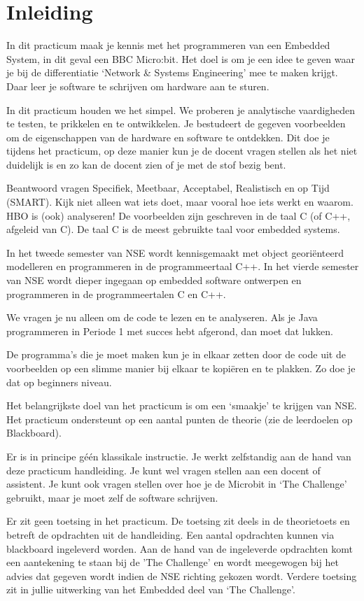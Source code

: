 \chapter{Inleiding}


In dit practicum maak je kennis met het programmeren van een Embedded System, in dit geval een 
BBC Micro:bit. Het doel is om je een idee te geven waar je bij de differentiatie ‘Network \& Systems Engineering’ mee te maken krijgt. Daar leer je software te schrijven om hardware aan te sturen.

In dit practicum houden we het simpel. We proberen je analytische vaardigheden te testen, te prikkelen en te ontwikkelen. Je bestudeert de gegeven voorbeelden om de eigenschappen van de hardware en software te ontdekken. Dit doe je tijdens het practicum, op deze manier kun je de docent vragen stellen als het niet duidelijk is en zo kan de docent zien of je met de stof bezig bent.  

Beantwoord vragen Specifiek, Meetbaar, Acceptabel,  Realistisch en op Tijd (SMART). 
Kijk niet alleen wat iets doet, maar vooral hoe iets werkt en waarom. HBO is (ook) analyseren!
De voorbeelden zijn geschreven in de taal C (of C++, afgeleid van C). De taal C is de meest gebruikte taal voor embedded systems.

In het tweede semester van NSE wordt kennisgemaakt met object georiënteerd modelleren en programmeren in de programmeertaal C++. In het vierde semester van NSE wordt dieper ingegaan op embedded software ontwerpen en programmeren in de programmeertalen C en C++. 

We vragen je nu alleen om de code te lezen en te analyseren. Als je Java programmeren in Periode 1 met succes hebt afgerond, dan moet dat lukken. 

De programma’s die je moet maken kun je in elkaar zetten door de code uit de voorbeelden op een slimme manier bij elkaar te kopiëren en te plakken. Zo doe je dat op beginners niveau.

Het belangrijkste doel van het practicum is om een ‘smaakje’ te krijgen van NSE. 
Het practicum ondersteunt op een aantal punten de theorie (zie de leerdoelen op Blackboard). 

Er is in principe géén klassikale instructie. Je werkt zelfstandig aan de hand van deze practicum handleiding. Je kunt wel vragen stellen aan een docent of assistent. Je kunt ook vragen stellen over hoe je de Microbit in ‘The Challenge’ gebruikt, maar je moet zelf de software schrijven.

Er zit geen toetsing in het practicum. De toetsing zit deels in de theorietoets en betreft de opdrachten uit de handleiding. Een aantal opdrachten kunnen via blackboard ingeleverd worden. Aan de hand van de ingeleverde opdrachten komt een aantekening te staan bij de 'The Challenge' en wordt meegewogen bij het advies dat gegeven wordt indien de NSE richting gekozen wordt. Verdere toetsing zit in jullie uitwerking van het Embedded deel van ‘The Challenge’.

